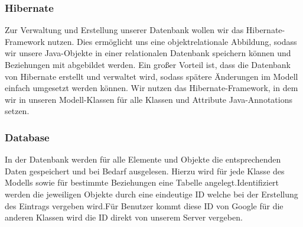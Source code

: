 \begin {center}
\end {center}


	\subsubsection{Hibernate}
	Zur Verwaltung und Erstellung unserer Datenbank wollen wir das Hibernate-Framework nutzen. 
	Dies ermöglicht uns eine objektrelationale Abbildung, sodass wir unsere Java-Objekte in einer relationalen Datenbank speichern können und Beziehungen mit abgebildet werden.
	Ein großer Vorteil ist, dass die Datenbank von Hibernate erstellt und verwaltet wird, sodass spätere Änderungen im Modell einfach umgesetzt werden können.
	Wir nutzen das Hibernate-Framework, in dem wir in unseren Modell-Klassen für alle Klassen und Attribute Java-Annotations setzen.
	
	\subsubsection{Database}
	In der Datenbank werden für alle Elemente und Objekte die entsprechenden Daten gespeichert und bei Bedarf ausgelesen. Hierzu wird für jede Klasse des Modells sowie für bestimmte Beziehungen eine Tabelle angelegt.Identifiziert werden die jeweiligen Objekte durch eine eindeutige ID welche bei der Erstellung des Eintrags vergeben wird.Für Benutzer kommt diese ID von Google für die anderen Klassen wird die ID direkt von unserem Server vergeben.
	
